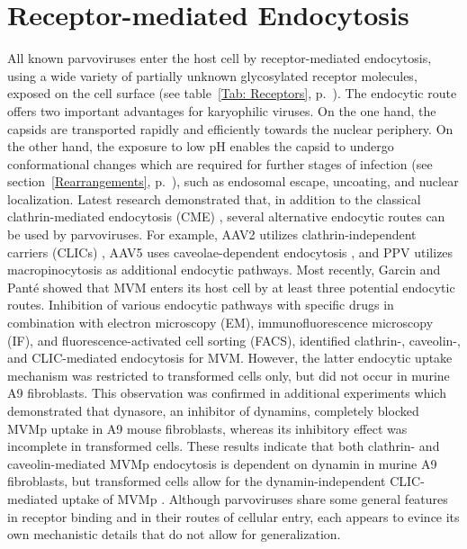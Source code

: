 \section{Receptor-mediated Endocytosis}
\label{Endocytosis}
All known parvoviruses enter the host cell by receptor-mediated endocytosis, using a wide variety of partially unknown glycosylated receptor molecules, exposed on the cell surface \cite{pmid18406140} (see table~\ref{Tab: Receptors}, p.~\pageref{Tab: Receptors}). The endocytic route offers two important advantages for karyophilic viruses. On the one hand, the capsids are transported rapidly and efficiently towards the nuclear periphery. On the other hand, the exposure to low pH enables the capsid to undergo conformational changes which are required for further stages of infection (see section~\ref{Rearrangements}, p.~\pageref{Rearrangements}), such as endosomal escape, uncoating, and nuclear localization. Latest research demonstrated that, in addition to the classical clathrin-mediated endocytosis (CME) \cite{pmid20484503, pmid10559355, pmid10644365}, several alternative endocytic routes can be used by parvoviruses. For example, AAV2 utilizes clathrin-independent carriers (CLICs) \cite{pmid22177561}, AAV5 uses caveolae-dependent endocytosis \cite{pmid19141440}, and PPV utilizes macropinocytosis \cite{pmid20484503} as additional endocytic pathways. Most recently, Garcin and Panté showed that MVM enters its host cell by at least three potential endocytic routes. Inhibition of various endocytic pathways with specific drugs in combination with electron microscopy (EM), immunofluorescence microscopy (IF), and fluorescence-activated cell sorting (FACS), identified clathrin-, caveolin-, and CLIC-mediated endocytosis for MVM. However, the latter endocytic uptake mechanism was restricted to transformed cells only, but did not occur in murine A9 fibroblasts. This observation was confirmed in additional experiments which demonstrated that dynasore, an inhibitor of dynamins, completely blocked MVMp uptake in A9 mouse fibroblasts, whereas its inhibitory effect was incomplete in transformed cells. These results indicate that both clathrin- and caveolin-mediated MVMp endocytosis is dependent on dynamin in murine A9 fibroblasts, but transformed cells allow for the dynamin-independent CLIC-mediated uptake of MVMp \cite{pmid25863880}. Although parvoviruses share some general features in receptor binding and in their routes of cellular entry, each appears to evince its own mechanistic details that do not allow for generalization.     

